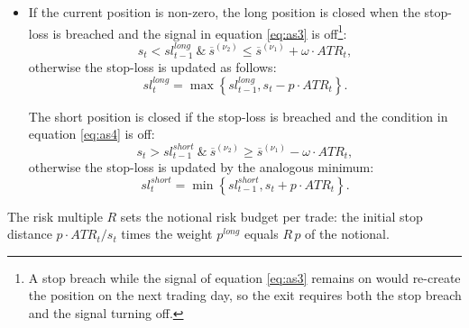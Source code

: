\documentclass[hidelinks]{siamonline250211}
\begin{document}
\begin{definition}
\begin{itemize}
		\item If the current position is non-zero, the long position is closed when the stop-loss is breached and the signal in equation \eqref{eq:as3} is off\footnote{A stop breach while the signal of equation \eqref{eq:as3} remains on would re-create the position on the next trading day, so the exit requires both the stop breach and the signal turning off.}:
		\begin{equation} \label{eq:as5} 
			s_{t} < sl^{long}_{t-1}  \ \& \ \overline{s}^{(\nu_{2})}  \leq \overline{s}^{(\nu_{1})} + \omega \cdot ATR_{t},
		\end{equation}
		otherwise the stop-loss is updated as follows:
		\begin{equation} \label{eq:as5a} 
			sl^{long}_{t} = \max\left\{ sl^{long}_{t-1},  s_{t} - p \cdot ATR_{t} \right\}.
		\end{equation}
		
		
		The short position is closed if the stop-loss is breached and the condition in equation \eqref{eq:as4} is off:
		\begin{equation} \label{eq:as6} 
			s_{t} > sl^{short}_{t-1}  \ \& \ \overline{s}^{(\nu_{2})}  \geq \overline{s}^{(\nu_{1})} - \omega \cdot ATR_{t},
		\end{equation}
		otherwise the stop-loss is updated by the analogous minimum:
		\begin{equation} \label{eq:as6a} 
			sl^{short}_{t} = \min\left\{ sl^{short}_{t-1},  s_{t} + p \cdot ATR_{t} \right\}.
		\end{equation}
		
	\end{itemize}
	
\end{definition}

The risk multiple $R$ sets the notional risk budget per trade: the initial stop distance $p \cdot ATR_{t}/s_{t}$ times the weight $p^{long}$ equals $R\,p$ of the notional.
\end{document}
